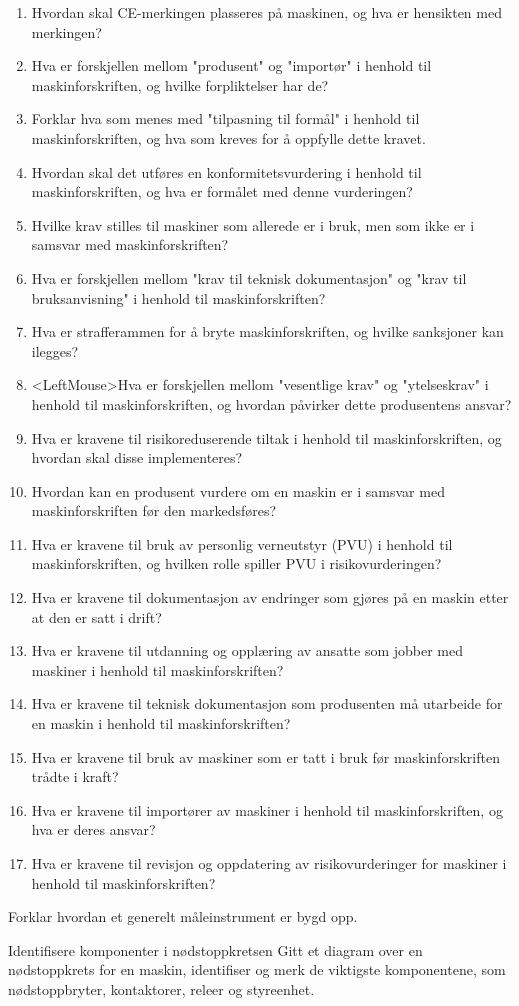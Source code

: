 \documentclass[12pt,a4paper]{article}
\def\oppgave{
		}
\begin{document}
\begin{enumerate}
\item Hvordan skal CE-merkingen plasseres på maskinen, og hva er hensikten med merkingen?
\item Hva er forskjellen mellom "produsent" og "importør" i henhold til maskinforskriften, og hvilke forpliktelser har de?
\item Forklar hva som menes med "tilpasning til formål" i henhold til maskinforskriften, og hva som kreves for å oppfylle dette kravet.
\item Hvordan skal det utføres en konformitetsvurdering i henhold til maskinforskriften, og hva er formålet med denne vurderingen?
\item Hvilke krav stilles til maskiner som allerede er i bruk, men som ikke er i samsvar med maskinforskriften?
\item Hva er forskjellen mellom "krav til teknisk dokumentasjon" og "krav til bruksanvisning" i henhold til maskinforskriften?
\item Hva er strafferammen for å bryte maskinforskriften, og hvilke sanksjoner kan ilegges?
\item <LeftMouse>Hva er forskjellen mellom "vesentlige krav" og "ytelseskrav" i henhold til maskinforskriften, og hvordan påvirker dette produsentens ansvar?
\item Hva er kravene til risikoreduserende tiltak i henhold til maskinforskriften, og hvordan skal disse implementeres?
\item Hvordan kan en produsent vurdere om en maskin er i samsvar med maskinforskriften før den markedsføres?
\item Hva er kravene til bruk av personlig verneutstyr (PVU) i henhold til maskinforskriften, og hvilken rolle spiller PVU i risikovurderingen?
\item Hva er kravene til dokumentasjon av endringer som gjøres på en maskin etter at den er satt i drift?
\item Hva er kravene til utdanning og opplæring av ansatte som jobber med maskiner i henhold til maskinforskriften?
\item Hva er kravene til teknisk dokumentasjon som produsenten må utarbeide for en maskin i henhold til maskinforskriften?
\item Hva er kravene til bruk av maskiner som er tatt i bruk før maskinforskriften trådte i kraft?
\item Hva er kravene til importører av maskiner i henhold til maskinforskriften, og hva er deres ansvar?
\item Hva er kravene til revisjon og oppdatering av risikovurderinger for maskiner i henhold til maskinforskriften?
\end{enumerate}
Forklar hvordan et generelt måleinstrument er bygd opp.
\oppgave{}%
\vskip 2.5pt 
Identifisere komponenter i nødstoppkretsen
\vskip 12pt
Gitt et diagram over en nødstoppkrets for en maskin, identifiser og merk de viktigste komponentene, som nødstoppbryter, kontaktorer, releer og styreenhet.
\end{document}

